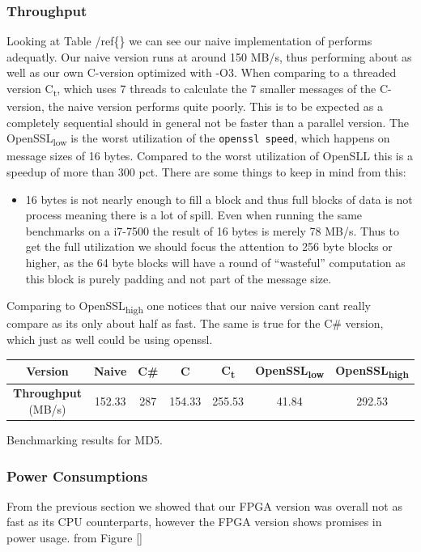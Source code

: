 \documentclass[a4paper]{article}
\begin{document}
\subsubsection{Throughput}
\label{sec:org701c86d}
Looking at Table /ref\{\} we can see our naive implementation of performs adequatly. Our naive version runs at around 150 MB/s, thus performing about as well as our own C-version optimized with -O3. When comparing to a threaded version C\textsubscript{t}, which uses 7 threads to calculate the 7 smaller messages of the C-version, the naive version performs quite poorly. This is to be expected as a completely sequential should in general not be faster than a parallel version. The OpenSSL\textsubscript{low} is the worst utilization of the \texttt{openssl speed}, which happens on message sizes of 16 bytes. Compared to the worst utilization of OpenSLL this is a speedup of more than 300 pct. There are some things to keep in mind from this:
\begin{itemize}
\item 16 bytes is not nearly enough to fill a block and thus full blocks of data is not process meaning there is a lot of spill. Even when running the same benchmarks on a i7-7500 the result of 16 bytes is merely 78 MB/s. Thus to get the full utilization we should focus the attention to 256 byte blocks or higher, as the 64 byte blocks will have a round of ``wasteful'' computation as this block is purely padding and not part of the message size.
\end{itemize}
Comparing to OpenSSL\textsubscript{high} one notices that our naive version cant really compare as its only about half as fast. The same is true for the C\# version, which just as well could be using openssl.
\begin{table}[htbp]
\centering
\begin{tabular}{|c|c|c|c|c|c|c|}
\hline
\textbf{Version} & Naive & C\# & C & C\textsubscript{t} & OpenSSL\textsubscript{low} & OpenSSL\textsubscript{high}\\
\hline
\textbf{Throughput} (MB/s) & 152.33 & 287 & 154.33 & 255.53 & 41.84 & 292.53\\
\hline
\end{tabular}
Benchmarking results for MD5.

\end{table}
\subsubsection{Power Consumptions}
\label{sec:org930226b}
From the previous section we showed that our FPGA version was overall not as fast as its CPU counterparts, however the FPGA version shows promises in power usage. from Figure \ref{}
\end{document}
